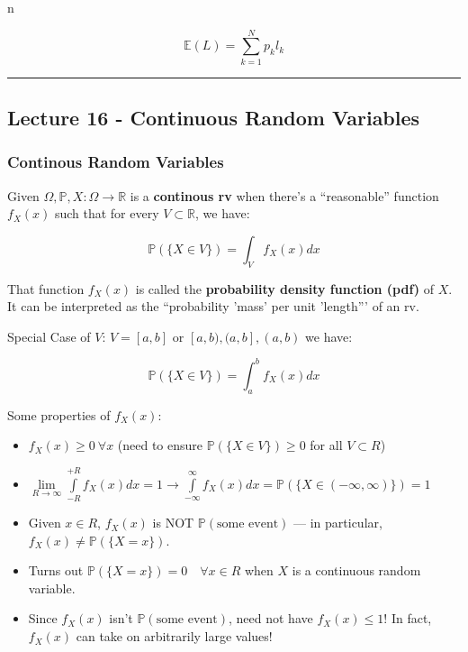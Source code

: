 n\documentclass{article}
\begin{document}
\[
  \mathbb{E}(L) = \sum_{k=1}^Np_kl_k
\]


\medskip\hrule
\subsection{Lecture 16 - Continuous Random Variables}

\subsubsection{Continous Random Variables}

Given $\Omega, \mathbb{P}, X: \Omega \rightarrow \mathbb{R}$ is a
\textbf{continous rv} when there's a ``reasonable'' function $f_X(x)$
such that for every $V \subset \mathbb{R}$, we have:

\begin{equation}
  \tag{Continuous rv}
  \boxed{
    \mathbb{P}(\{X\in V\}) = \int_V f_X(x)dx
  }
\end{equation}

That function $f_X(x)$ is called the \textbf{probability density
  function (pdf)} of $X$. It can be interpreted as the ``probability
'mass' per unit 'length''' of an rv.

Special Case of $V$: $V = [a,b]$ or $[a,b), (a,b], (a,b)$ we have:

\[
  \mathbb{P}(\{X\in V\}) = \int_a^b f_X(x)dx
\]

Some properties of $f_X(x)$:

\begin{itemize}
\item $f_X(x) \geq 0 \ \forall x$ (need to ensure $\mathbb{P}(\{X \in
  V\}) \geq 0$ for all $V \subset R$)

\item $\lim\limits_{R\to\infty} \int\limits_{-R}^{+R} f_X(x) dx = 1
  \rightarrow \int\limits_{-\infty}^{\infty} f_X(x)dx =
  \mathbb{P}(\{X\in(-\infty,\infty)\}) = 1$

\item Given $x\in R$, $f_X(x)$ is NOT $\mathbb{P}(\text{some event})$
  --- in particular, $f_X(x) \not= \mathbb{P}(\{X=x\})$.

\item Turns out $\mathbb{P}(\{X=x\})=0 \quad \forall x\in R$ when $X$
  is a continuous random variable.

\item Since $f_X(x)$ isn't $\mathbb{P}(\text{some event})$, need not
  have $f_X(x) \leq 1$! In fact, $f_X(x)$ can take on arbitrarily
  large values!
\end{itemize}
\end{document}
